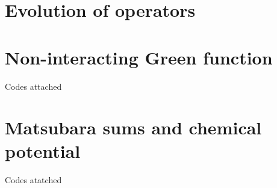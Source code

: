 








\section{Evolution of operators}


\section{Non-interacting Green function}
Codes attached
%

\section{Matsubara sums and chemical potential}
%
Codes atatched


